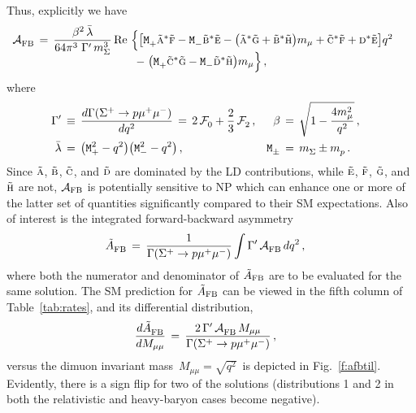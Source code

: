 \documentclass[amsmath,amssymb,aps,nofootinbib,prd,preprint,superscriptaddress,tightenlines,a4paper,bm]{revtex4-2}
\begin{document}
Thus, explicitly we have \cite{He:2018yzu}
\begin{align} \label{AFB}
{\cal A}_{\rm FB}^{} & \,=\, \frac{\beta^2\, \bar\lambda}{64\pi^{3\,}\, \Gamma'\, m_\Sigma^3}\, {\rm Re}\! \begin{array}[t]{l} \Big\{ \big[ {\texttt M}_+^{} \tilde{\textsc a}{}^*\tilde{\textsc f}
- {\texttt M}_-^{} \tilde{\textsc b}{}^* \tilde{\textsc e}
- \big( \tilde{\textsc a}{}^*\tilde{\textsc g}+\tilde{\textsc b}{}^*\tilde{\textsc h}\big) m_\mu
+ \tilde{\textsc c}{}^*\tilde{\textsc f} + {\textsc d}{}^*\tilde{\textsc e} \big] q^2
\vspace{1pt} \\ \;\,
-\; \big( {\texttt M}_+^{} \tilde{\textsc c}{}^* \tilde{\textsc g}
- {\texttt M}_-^{} \tilde{\textsc d}{}^* \tilde{\textsc h} \big) m_\mu \Big\} \,, \end{array} &
\end{align}
%
where
%
\begin{align}
\Gamma' & \,\equiv\, \frac{d\Gamma(\Sigma^+\to p \mu^+\mu^-)}{dq^2} \,=\, 2\,{\cal F}_0^{} + \frac{2}{3}\, {\cal F}_2^{} \,, & \beta & \,=\, \sqrt{1-\frac{4m_\mu^2}{q^2}} \,, \nonumber \\
\bar\lambda & \,=\,
\big({\tt M}_+^2-q^2\big) \big({\tt M}_-^2-q^2\big) \,, & {\tt M}_\pm^{} & \,=\, m_\Sigma^{}\pm m_p^{} \,. &
\end{align}
%
Since $\tilde{\textsc a}$, $\tilde{\textsc b}$, $\tilde{\textsc c}$, and $\tilde{\textsc d}$ are dominated by the LD contributions, while $\tilde{\textsc e}$, $\tilde{\textsc f}$, $\tilde{\textsc g}$, and $\tilde{\textsc h}$ are not, ${\cal A}_{\rm FB}$ is potentially sensitive to NP which can enhance one or more of the latter set of quantities significantly compared to their SM expectations.
Also of interest is the integrated forward-backward asymmetry
%
\begin{align}
  {\tilde A}_{\rm FB}^{} & \,=\, \frac{1}{\Gamma(\Sigma^+\to p\mu^+\mu^-)} \int \Gamma'\, {\cal A}_{\rm FB}^{}\, dq^2 \,, &
  \label{eq:afbin}
\end{align}
where both the numerator and denominator of ${\tilde A}_{\rm FB}$ are to be evaluated for the same solution.
The SM prediction for ${\tilde A}_{\rm FB}$ can be viewed in the fifth column of Table~\ref{tab:rates}, and its differential distribution,
%
\begin{align}
\frac{d{\tilde A}_{\rm FB}^{}}{dM_{\mu\mu}} & \,=\, \frac{2\, \Gamma'\, {\cal A}_{\rm FB}^{}\, M_{\mu\mu}}{\Gamma(\Sigma^+\to p\mu^+\mu^-)} \,, &
\end{align}
versus the dimuon invariant mass \,$M_{\mu\mu}=\sqrt{q^2}$\, is depicted in Fig.~\ref{f:afbtil}.
Evidently, there is a sign flip for two of the solutions (distributions 1 and 2 in both the relativistic and heavy-baryon cases become negative).
\end{document}

